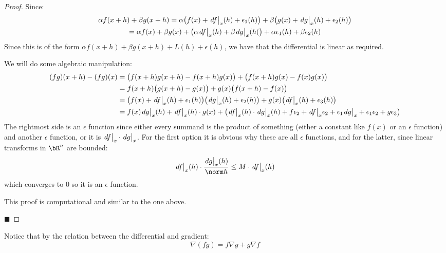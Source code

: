 \documentclass[10pt]{article}
\def\differ#1#2{\left.d#1\strut\right|_{#2}}
\begin{document}
\begin{proof}

    \benum
        \item Since:
        \begin{gather*}
            \alpha f(x+h)+\beta g(x+h) = \alpha\bigl(f(x)+\differ fx(h)+\epsilon_1(h)\bigr) + \beta\bigl(g(x)+\differ gx(h)+\epsilon_2(h)\bigr)\\
            = \alpha f(x)+\beta g(x) +
            \bigl(\alpha\differ fx(h)+\beta\differ gx(h(\bigr) + \alpha\epsilon_1(h)+\beta\epsilon_2(h)
        \end{gather*}
        Since this is of the form $\alpha f(x+h)+\beta g(x+h)+L(h)+\epsilon(h)$, we have that the differential is linear as required.

        \item We will do some algebraic manipulation:
        \begin{align*}
            (fg)(x+h)-(fg)(x) &= \bigl(f(x+h)g(x+h)-f(x+h)g(x)\bigr) + \bigl(f(x+h)g(x)-f(x)g(x)\bigr)\\
            &= f(x+h)\bigl(g(x+h)-g(x)\bigr) + g(x)\bigl(f(x+h)-f(x)\bigr) \\
            &= \bigl(f(x)+\differ fx(h)+\epsilon_1(h)\bigr)\bigl(\differ gx(h)+\epsilon_2(h)\bigr) + g(x)\bigl(\differ fx(h) + \epsilon_3(h)\bigr) \\
                &= f(x)\differ gx(h) + \differ fx(h)\cdot g(x) + \bigl(\differ fx(h)\cdot\differ gx(h) + f\epsilon_2 + \differ fx\epsilon_2 + \epsilon_1\differ gx+\epsilon_1\epsilon_2 + g\epsilon_3\bigr)
        \end{align*}
        The rightmost side is an $\epsilon$ function since either every summand is the product of something (either a constant like $f(x)$ or an $\epsilon$ function) and another $\epsilon$ function, or it
        is $\differ fx\cdot\differ gx$.
        For the first option it is obvious why these are all $\epsilon$ functions, and for the latter, since linear transforms in $\bR^n$ are bounded:
        \[ \differ fx(h)\cdot\frac{\differ gx(h)}{\norm h} \leq M\cdot\differ fx(h) \]
        which converges to $0$ so it is an $\epsilon$ function.

        \item This proof is computational and similar to the one above.
    \eenum

    \hfill$\blacksquare$

\end{proof}

Notice that by the relation between the differential and gradient:
\[ \nabla(fg) = f\nabla g+g\nabla f \]
\end{document}
